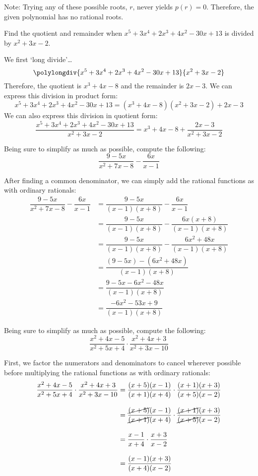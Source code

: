 \documentclass[12pt,letterpaper]{exam}
\begin{document}
\begin{questions}
\vfill

Note: Trying any of these possible roots, $r$, never yields $p(r)= 0$. Therefore, the given polynomial has no rational roots. 



\newpage
\question[10] Find the quotient and remainder when $x^5 + 3x^4 + 2x^3 + 4x^2 - 30x + 13$ is divided by $x^2 + 3x - 2$. \pspace

\sol We first `long divide'\dots
	\[
	\polylongdiv{x^5 + 3x^4 + 2x^3 + 4x^2 - 30x + 13}{x^2 + 3x - 2}
	\]
Therefore, the quotient is $x^3 + 4x - 8$ and the remainder is $2x - 3$. We can express this division in product form:
	\[
	x^5 + 3x^4 + 2x^3 + 4x^2 - 30x + 13= (x^3 + 4x - 8)(x^2 + 3x - 2) + 2x - 3
	\]
We can also express this division in quotient form:
	\[
	\dfrac{x^5 + 3x^4 + 2x^3 + 4x^2 - 30x + 13}{x^2 + 3x - 2}= x^3 + 4x - 8 + \dfrac{2x - 3}{x^2 + 3x - 2}
	\]



\newpage
\question[10] Being sure to simplify as much as possible, compute the following:
	\[
	\dfrac{9 - 5x}{x^2 + 7x - 8} - \dfrac{6x}{x - 1}
	\] \pspace

\sol After finding a common denominator, we can simply add the rational functions as with ordinary rationals:
	\[
	\begin{aligned}
	\dfrac{9 - 5x}{x^2 + 7x - 8} - \dfrac{6x}{x - 1}&= \dfrac{9 - 5x}{(x - 1)(x + 8)} - \dfrac{6x}{x - 1} \\[0.3cm]
	&= \dfrac{9 - 5x}{(x - 1)(x + 8)} - \dfrac{6x(x + 8)}{(x - 1)(x + 8)} \\[0.3cm]
	&= \dfrac{9 - 5x}{(x - 1)(x + 8)} - \dfrac{6x^2 + 48x}{(x - 1)(x + 8)} \\[0.3cm]
	&= \dfrac{(9 - 5x) - (6x^2 + 48x)}{(x - 1)(x + 8)} \\[0.3cm]
	&= \dfrac{9 - 5x - 6x^2 - 48x}{(x - 1)(x + 8)} \\[0.3cm]
	&= \dfrac{-6x^2 - 53x + 9}{{(x - 1)(x + 8)}}
	\end{aligned}
	\]



\newpage
\question[10] Being sure to simplify as much as possible, compute the following:
	\[
	\dfrac{x^2 + 4x - 5}{x^2 + 5x + 4} \cdot \dfrac{x^2 + 4x + 3}{x^2 + 3x - 10}
	\] \pspace

\sol First, we factor the numerators and denominators to cancel wherever possible before multiplying the rational functions as with ordinary rationals:
	\[
	\begin{aligned}
	\dfrac{x^2 + 4x - 5}{x^2 + 5x + 4} \cdot \dfrac{x^2 + 4x + 3}{x^2 + 3x - 10}&= \dfrac{(x + 5)(x - 1)}{(x + 1)(x + 4)} \cdot \dfrac{(x + 1)(x + 3)}{(x + 5)(x - 2)} \\[0.3cm]
	&= \dfrac{\cancel{(x + 5)}(x - 1)}{\cancel{(x + 1)}(x + 4)} \cdot \dfrac{\cancel{(x + 1)}(x + 3)}{\cancel{(x + 5)}(x - 2)} \\[0.3cm]
	&= \dfrac{x - 1}{x + 4} \cdot \dfrac{x + 3}{x - 2} \\[0.3cm]
	&= \dfrac{(x - 1)(x + 3)}{(x + 4)(x - 2)}
	\end{aligned}
	\]




\end{questions}
\end{document}
